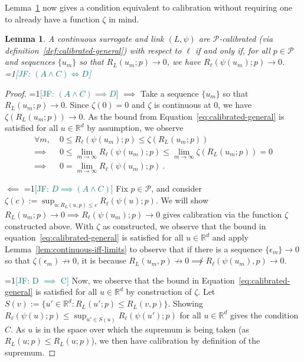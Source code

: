 \documentclass{article} %
\newcommand{\Comments}{0}
\newcommand{\mynote}[2]{\ifnum\Comments=1\textcolor{#1}{#2}\fi}
\newcommand{\jessie}[1]{\mynote{teal}{[JF: #1]}}
\newcommand{\reals}{\mathbb{R}}
\renewcommand{\P}{\mathcal{P}}
\newtheorem{lemma}{Lemma}
\begin{document}
Lemma~\ref{lem:calib-converging-regrets} now gives a condition equivalent to calibration without requiring one to already have a function $\zeta$ in mind.
\begin{lemma}\label{lem:calib-converging-regrets}
	A continuous surrogate and link $(L,\psi)$ are $\P$-calibrated (via definition~\ref{def:calibrated-general}) with respect to $\ell$ if and only if, for all $p \in \P$ and sequences $\{u_m\}$ so that $R_L(u_m; p) \to 0$, we have $R_\ell(\psi(u_m); p) \to 0$.
	\jessie{$(A \wedge C) \iff D$}
\end{lemma}
\begin{proof}
\jessie{$(A \wedge C) \implies D$}
	$\implies$ Take a sequence $\{u_m\}$ so that $R_L(u_m;p) \to 0$.
	Since $\zeta(0) = 0$ and $\zeta$ is continuous at $0$, we have $\zeta(R_L(u_m;p)) \to 0$.
	As the bound from Equation~\eqref{eq:calibrated-general} is satisfied for all $u \in \reals^d$ by assumption, we observe
	\begin{align*}
	\forall m, \; &0 \leq R_\ell(\psi(u_m); p) \leq \zeta(R_L(u_m;p))\\
	\implies &0 \leq \lim_{m \to \infty} R_\ell(\psi(u_m); p) \leq \lim_{m \to \infty} \zeta(R_L(u_m;p)) = 0\\
	\implies &0 = \lim_{m\to\infty} R_\ell(\psi(u_m); p) ~.~
	\end{align*}
	
	
	$\impliedby$ 
\jessie{$D \implies (A \wedge C)$}
	Fix $p \in \P$, and consider $\zeta(c) := \sup_{u: R_L(u,p) \leq c} R_\ell(\psi(u); p)$.  
	We will show $R_L(u_m; p) \to 0 \implies R_\ell(\psi(u_m); p) \to 0$ gives calibration via the function $\zeta$ constructed above. 
	With $\zeta$ as constructed, we observe that the bound in equation~\eqref{eq:calibrated-general} is satisfied for all $u \in \reals^d$ and apply Lemma~\ref{lem:continuous-iff-limits} to observe that if there is a sequence $\{\epsilon_m\} \to 0$ so that $\zeta(\epsilon_m) \not \to 0$, it is because $R_L(u_m, p) \not \to 0 \not\implies R_\ell(\psi(u_m), p) \to 0$.
	

\jessie{D $\implies$ C}
Now, we observe that the bound in Equation~\eqref{eq:calibrated-general} is satisfied for all $u \in \reals^d$ by construction of $\zeta$.
Let $S(v) := \{u' \in \reals^d : R_L(u';p) \leq R_L(v,p) \}$.
Showing $R_\ell(\psi(u);p) \leq \sup_{u' \in S(u)} R_\ell(\psi(u') ; p)$ for all $u \in \reals^d$ gives the condition $C$.
As $u$ is in the space over which the supremum is being taken (as $R_L(u;p) \leq R_L(u;p)$), we then have calibration by definition of the supremum.


\end{proof}
\end{document}
